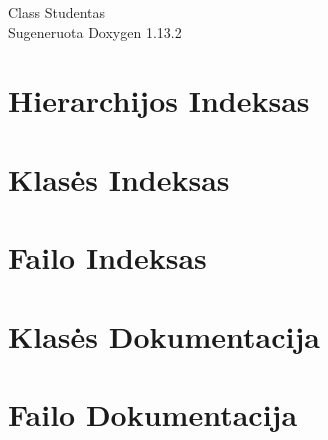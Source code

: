 \documentclass[twoside]{book}
\newcommand{\+}{\discretionary{\mbox{\scriptsize$\hookleftarrow$}}{}{}}
\newcommand{\clearemptydoublepage}{%
    \newpage{\pagestyle{empty}\cleardoublepage}%
  }
\begin{document}
  \raggedbottom
    \hypersetup{pageanchor=false,
                bookmarksnumbered=true,
                pdfencoding=unicode
               }
  \begin{titlepage}
  \vspace*{7cm}
  \begin{center}%
  {\Large Class Studentas}\\
  \vspace*{1cm}
  {\large Sugeneruota Doxygen 1.13.2}\\
  \end{center}
  \end{titlepage}
  \clearemptydoublepage
  \tableofcontents
  \clearemptydoublepage
  \hypersetup{pageanchor=true}
\chapter{Hierarchijos Indeksas}

\chapter{Klasės Indeksas}

\chapter{Failo Indeksas}

\chapter{Klasės Dokumentacija}


\chapter{Failo Dokumentacija}
















  \backmatter
  \newpage
  \clearemptydoublepage
  \printindex
\end{document}
